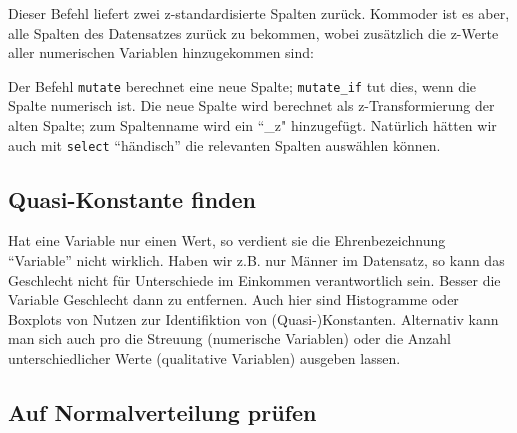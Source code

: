 \documentclass[12pt,ngerman,]{book}
\newenvironment{Shaded}{\begin{snugshade}}{\end{snugshade}}
\newcommand{\KeywordTok}[1]{\textcolor[rgb]{0.13,0.29,0.53}{\textbf{{#1}}}}
\newcommand{\StringTok}[1]{\textcolor[rgb]{0.31,0.60,0.02}{{#1}}}
\newcommand{\CommentTok}[1]{\textcolor[rgb]{0.56,0.35,0.01}{\textit{{#1}}}}
\newcommand{\NormalTok}[1]{{#1}}
\renewenvironment{Shaded}{\begin{kframe}}{\end{kframe}}
\begin{document}
Dieser Befehl liefert zwei z-standardisierte Spalten zurück. Kommoder
ist es aber, alle Spalten des Datensatzes zurück zu bekommen, wobei
zusätzlich die z-Werte aller numerischen Variablen hinzugekommen sind:

\begin{Shaded}
\end{Shaded}

Der Befehl \texttt{mutate} berechnet eine neue Spalte;
\texttt{mutate\_if} tut dies, wenn die Spalte numerisch ist. Die neue
Spalte wird berechnet als z-Transformierung der alten Spalte; zum
Spaltenname wird ein ``\_z" hinzugefügt. Natürlich hätten wir auch mit
\texttt{select} ``händisch'' die relevanten Spalten auswählen können.

\subsection{Quasi-Konstante finden}\label{quasi-konstante-finden}

Hat eine Variable nur einen Wert, so verdient sie die Ehrenbezeichnung
``Variable'' nicht wirklich. Haben wir z.B. nur Männer im Datensatz, so
kann das Geschlecht nicht für Unterschiede im Einkommen verantwortlich
sein. Besser die Variable Geschlecht dann zu entfernen. Auch hier sind
Histogramme oder Boxplots von Nutzen zur Identifiktion von
(Quasi-)Konstanten. Alternativ kann man sich auch pro die Streuung
(numerische Variablen) oder die Anzahl unterschiedlicher Werte
(qualitative Variablen) ausgeben lassen.

\subsection{Auf Normalverteilung
prüfen}\label{auf-normalverteilung-prufen}
\end{document}
